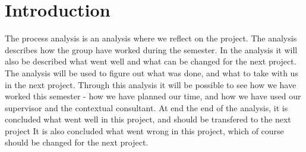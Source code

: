 \chapter{Introduction}
The process analysis is an analysis where we reflect on the project. The analysis describes how the group have worked during the semester. In the analysis it will also be described what went well and what can be changed for the next project. The analysis will be used to figure out what was done, and what to take with us in the next project. Through this analysis it will be possible to see how we have worked this semester - how we have planned our time, and how we have used our supervisor and the contextual consultant. At end the end of the analysis, it is concluded what went well in this project, and should be transfered to the next project It is also concluded what went wrong in this project, which of course should be changed for the next project. 